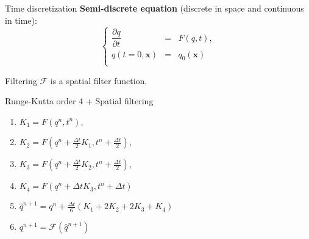\documentclass[11pt]{beamer}
\begin{document}

\begin{frame}{Time discretization}
\textbf{Semi-discrete equation }(discrete in space and continuous in time):
\begin{equation}
\left\lbrace
\begin{array}{rcl}
\dfrac{\partial q}{\partial t} & = & F(q,t), \\
q(t=0,\mathbf{x}) & = & q_0(\mathbf{x}) \\
\end{array}
\right.
\end{equation}

\begin{block}{Filtering}
$\mathcal{F}$ is a spatial filter function.
\end{block}

\begin{block}{Runge-Kutta order 4 + Spatial filtering}

\begin{enumerate}
\item $K_1 = F(q^n, t^n)$,
\item $K_2 = F(q^n + \frac{\Delta t}{2} K_1, t^n + \frac{\Delta t}{2})$,
\item $K_3 = F(q^n + \frac{\Delta t}{2} K_2, t^n + \frac{\Delta t}{2})$,
\item $K_4 = F(q^n + \Delta t K_3, t^n + \Delta t)$
\item $\hat{q}^{n+1} = q^n + \frac{\Delta t}{6} \left( K_1 + 2 K_2 + 2 K_3 + K_4 \right)$
\item $q^{n+1} = \mathcal{F}(\hat{q}^{n+1})$
\end{enumerate}
\end{block}
\end{frame}

\end{document}
